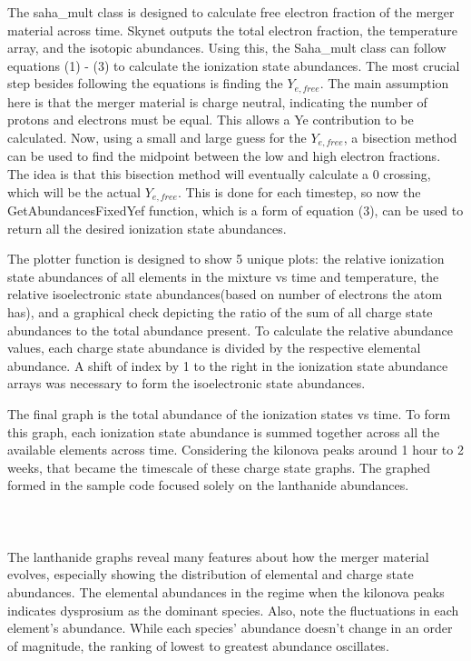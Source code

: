 \documentclass[11pt,a4paper]{article}
\begin{document}
The saha\_mult class is designed to calculate free electron fraction of the merger material across time. Skynet outputs the total electron fraction, the temperature array, and the isotopic abundances. Using this, the Saha\_mult class can follow equations (1) - (3) to calculate the ionization state abundances. The most crucial step besides following the equations is finding the $Y_{e,free}$. The main assumption here is that the merger material is charge neutral, indicating the number of protons and electrons must be equal. This allows a Ye contribution to be calculated. Now, using a small and large guess for the $Y_{e,free}$, a bisection method can be used to find the midpoint between the low and high electron fractions. The idea is that this bisection method will eventually calculate a 0 crossing, which will be the actual $Y_{e,free}$. This is done for each timestep, so now the GetAbundancesFixedYef function, which is a form of equation (3), can be used to return all the desired ionization state abundances.

The plotter function is designed to show 5 unique plots: the relative ionization state abundances of all elements in the mixture vs time and temperature, the relative isoelectronic state abundances(based on number of electrons the atom has), and a graphical check depicting the ratio of the sum of all charge state abundances to the total abundance present. To calculate the relative abundance values, each charge state abundance is divided by the respective elemental abundance. A shift of index by 1 to the right in the ionization state abundance arrays was necessary to form the isoelectronic state abundances.

The final graph is the total abundance of the ionization states vs time. To form this graph, each ionization state abundance is summed together across all the available elements across time. Considering the kilonova peaks around 1 hour to 2 weeks, that became the timescale of these charge state graphs. The graphed formed in the sample code focused solely on the lanthanide abundances.      		
\\\\
\\\\
The lanthanide graphs reveal many features about how the merger material evolves, especially showing the distribution of elemental and charge state abundances. The elemental abundances in the regime when the kilonova peaks indicates dysprosium as the dominant species. Also, note the fluctuations in each element's abundance. While each species' abundance doesn't change in an order of magnitude, the ranking of lowest to greatest abundance oscillates.
\end{document}
